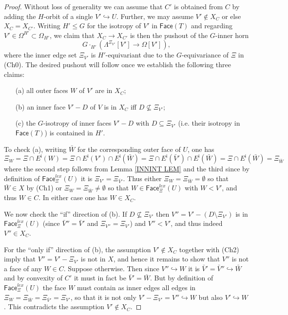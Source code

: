 \documentclass[a4paper,10pt,draft]{article}%
\numberwithin{equation}{section}%
\numberwithin{figure}{section}
\begin{document}
\begin{proof}
Without loss of generality we can assume that $C'$ is obtained from $C$ by adding the $H$-orbit of a single $V' \hookrightarrow U$. Further, we may assume $V' \not \in X_C$ or else $X_C=X_{C'}$.
Writing $H' \leq G$ for the isotropy of $V'$ in $\mathsf{Face}(T)$ and regarding $V' \in \Omega^{H'}\subset \Omega_{H'}$, we claim that $X_C \to X_{C'}$ is then the pushout of the $G$-inner horn
\[
	G \cdot_{H'} 
	\left( \Lambda^{\Xi_{V'}}[V'] \to \Omega[V'] \right),
\]
where the inner edge set $\Xi_{V'}$ is $H'$-equivariant due to the $G$-equivariance of $\Xi$ in (Ch0).
The desired pushout will follow once we establish the following three claims:
\begin{enumerate}
\item[(a)] all outer faces $W$ of $V'$ are in $X_C$;
\item[(b)] an inner face $V' - D$ of $V$ is in $X_C$ iff 
$D \not \subseteq \Xi_{V'}$;
\item[(c)] the $G$-isotropy of inner faces $V' - D$ with 
$D \subseteq \Xi_{V'}$ 
(i.e. their isotropy in $\mathsf{Face}(T)$)
is contained in $H'$.
\end{enumerate}
To check (a), writing $\bar{W}$ for the corresponding outer face of $U$, one has
	\[
	\Xi_W = \Xi \cap E^{\mathsf{i}} (W) 
	= \Xi \cap E^{\mathsf{i}}(V') \cap E^{\mathsf{i}}(\bar{W})
	= \Xi \cap E^{\mathsf{i}}(\bar{V}') \cap E^{\mathsf{i}}(\bar{W})
	= \Xi \cap E^{\mathsf{i}}(\bar{W})
	= \Xi_{\bar{W}}
	\]
where the second step follows from Lemma \ref{INNINT LEM}
and the third since by definition of
$\mathsf{Face}_{\Xi}^{lex}(U)$ it is $\Xi_{V'} = \Xi_{\bar{V}'}$.
Thus either $\Xi_W = \Xi_{\bar{W}} = \emptyset$ so that $\bar{W}\in X$ by (Ch1) 
or $\Xi_W = \Xi_{\bar{W}} \neq \emptyset$
so that $W \in \mathsf{Face}_{\Xi}^{lex}(U)$ with $W<V'$, and thus $W\in C$. In either case one has $W \in X_C$.

We now check the ``if'' direction of (b).
If $D \not \subseteq \Xi_{V'}$
then $V'' = V' - (D \setminus \Xi_{V'})$
is in $\mathsf{Face}_{\Xi}^{lex}(U)$
(since $\bar{V}'' = \bar{V}'$ and $\Xi_{V''} = \Xi_{V'}$)
and $V''<V'$, and thus indeed $V'' \in X_C$.

For the ``only if'' direction of (b), the assumption $V' \not \in X_C$ together with (Ch2) imply that
$V''=V'-\Xi_{V'}$ is not in $X$, and hence it remains to show that 
$V''$ is not a face of any $W \in C$. Suppose otherwise.
Then since $V'' \hookrightarrow W$ it is $ \bar{V}' = \bar{V}'' \hookrightarrow \bar{W}$
and by convexity of $C'$ it must in fact be 
$ \bar{V}' = \bar{W}$. But by definition of 
$\mathsf{Face}_{\Xi}^{lex}(U)$ the face $W$ must contain as inner edges all edges in 
$\Xi_W=\Xi_{\bar{W}} = \Xi_{\bar{V}'} = \Xi_{V'}$,
so that it is not only $V' - \Xi_{V'} = V'' \hookrightarrow W$ but also $V' \hookrightarrow W$.
This contradicts the assumption $V' \not \in X_C$.


\end{proof}
\end{document}
